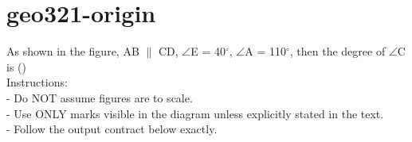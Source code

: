 \documentclass[12pt]{article}
\begin{document}
\section*{geo321-origin}
\noindent\begin{minipage}{\textwidth}
\setlength{\parskip}{4pt}
As shown in the figure, AB \ensuremath{\parallel } CD, \ensuremath{\angle }E = 40\ensuremath{^\circ}, \ensuremath{\angle }A = 110\ensuremath{^\circ}, then the degree of \ensuremath{\angle }C is ()\\
Instructions:\\
- Do NOT assume figures are to scale.\\
- Use ONLY marks visible in the diagram unless explicitly stated in the text.\\
- Follow the output contract below exactly.\\
\end{minipage}
\end{document}
